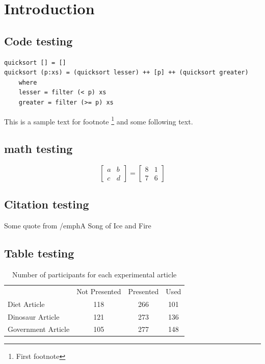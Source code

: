 \chapter{Introduction}\label{chapter:intro}

\section{Code testing}

\blindtext

\begin{verbatim}
quicksort [] = []
quicksort (p:xs) = (quicksort lesser) ++ [p] ++ (quicksort greater)
    where
    lesser = filter (< p) xs
    greater = filter (>= p) xs
\end{verbatim}

This is a sample text for footnote \footnote{First footnote \blindtext} and
some following text.

\section{math testing}

\[
\begin{bmatrix}
    a  &  b \\
    c  &  d      
\end{bmatrix}
= 
\begin{bmatrix}
    8  &  1 \\
    7  &  6      
\end{bmatrix}
\]

\section{Citation testing}

Some quote from /emph{A Song of Ice and Fire}\cite{dance-with-dragons}

\section{Table testing}

\begin{table}[htb]
    \centering
    \begin{tabular}{lccc}
        & Not Presented & Presented & Used \\
        Diet Article       & 118           & 266       & 101  \\
        Dinosaur Article   & 121           & 273       & 136  \\
        Government Article & 105           & 277       & 148 
    \end{tabular}
    \caption{Number of participants for each experimental article}
\end{table}

